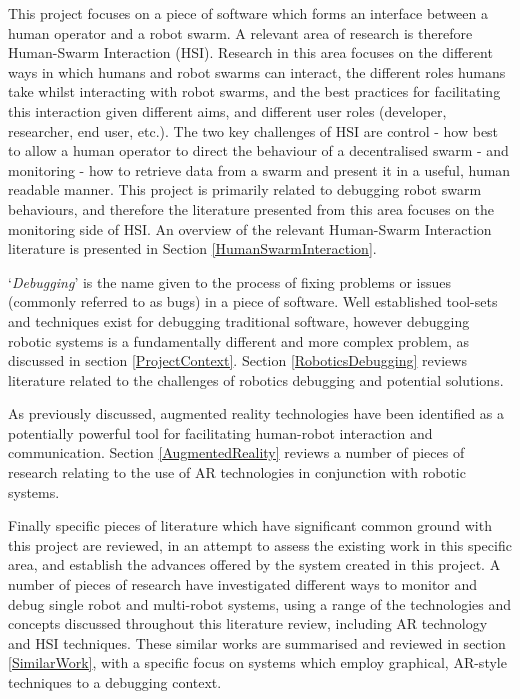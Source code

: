 This project focuses on a piece of software which forms an interface between a human operator and a robot swarm. A relevant area of research is therefore Human-Swarm Interaction (HSI). Research in this area focuses on the different ways in which humans and robot swarms can interact, the different roles humans take whilst interacting with robot swarms, and the best practices for facilitating this interaction given different aims, and different user roles (developer, researcher, end user, etc.). The two key challenges of HSI are control - how best to allow a human operator to direct the behaviour of a decentralised swarm - and monitoring - how to retrieve data from a swarm and present it in a useful, human readable manner. This project is primarily related to debugging robot swarm behaviours, and therefore the literature presented from this area focuses on the monitoring side of HSI. An overview of the relevant Human-Swarm Interaction literature is presented in Section \ref{HumanSwarmInteraction}.

`\textit{Debugging}' is the name given to the process of fixing problems or issues (commonly referred to as bugs) in a piece of software. Well established tool-sets and techniques exist for debugging traditional software, however debugging robotic systems is a fundamentally different and more complex problem, as discussed in section \ref{ProjectContext}. Section \ref{RoboticsDebugging} reviews literature related to the challenges of robotics debugging and potential solutions.

As previously discussed, augmented reality technologies have been identified as a potentially powerful tool for facilitating human-robot interaction and communication. Section \ref{AugmentedReality} reviews a number of pieces of research relating to the use of AR technologies in conjunction with robotic systems.

Finally specific pieces of literature which have significant common ground with this project are reviewed, in an attempt to assess the existing work in this specific area, and establish the advances offered by the system created in this project. A number of pieces of research have investigated different ways to monitor and debug single robot and multi-robot systems, using a range of the technologies and concepts discussed throughout this literature review, including AR technology and HSI techniques. These similar works are summarised and reviewed in section \ref{SimilarWork}, with a specific focus on systems which employ graphical, AR-style techniques to a debugging context.

